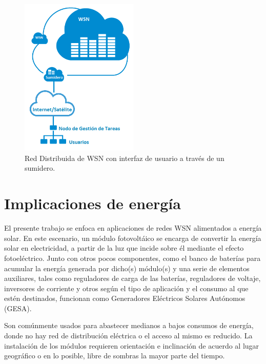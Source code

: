 \begin{figure}[h!]
	\centering
    \includegraphics[width=0.5\textwidth]{./Figures/RedDistribuida.png}
    	\caption{Red Distribuida de WSN con interfaz de usuario a través de un sumidero.}
	\label{fig:distrib}
\end{figure} 

\section{Implicaciones de energía}
\label{sec:energía}

El presente trabajo se enfoca en aplicaciones de redes WSN alimentados a energía solar. En este escenario, un módulo fotovoltáico se encarga de convertir la energía solar en electricidad, a partir de la luz que incide sobre él mediante el efecto fotoeléctrico. Junto con otros pocos componentes, como el banco de baterías para acumular la energía generada por dicho(s) módulo(s) y una serie de elementos auxiliares, tales como reguladores de carga de las baterías, reguladores de voltaje, inversores de corriente y otros según el tipo de aplicación y el consumo al que estén destinados, funcionan como Generadores Eléctricos Solares Autónomos (GESA).

Son comúnmente usados para abastecer medianos a bajos consumos de energía, donde no hay red de distribución eléctrica o el acceso al mismo es reducido. La instalación de los módulos requieren orientación e inclinación de acuerdo al lugar geográfico o en lo posible, libre de sombras la mayor parte del tiempo.


